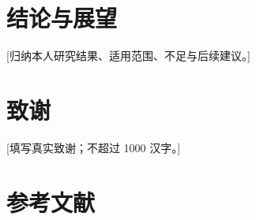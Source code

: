 \documentclass[UTF8,zihao=-4,twoside,openany,fontset=windows]{ctexbook}
\renewcommand{\thefigure}{\thechapter-\arabic{figure}}
\renewcommand{\thetable}{\thechapter-\arabic{table}}
\renewcommand{\theequation}{\thechapter-\arabic{equation}}
\begin{document}
\chapter{结论与展望}
[归纳本人研究结果、适用范围、不足与后续建议。]

\chapter*{致\quad 谢}
[填写真实致谢；不超过 1000 汉字。]

\chapter*{参考文献}

\end{document}
